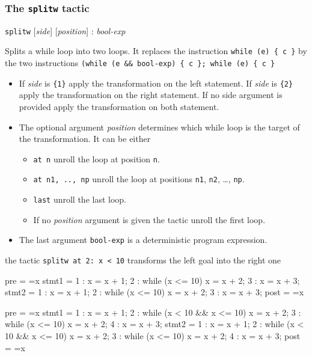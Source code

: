 \subsubsection{The \texttt{splitw} tactic}\label{tac:splitw} \DONE

\Syntax \verb+splitw+ [\textit{side}] [\textit{position}] : \textit{bool-exp}

\Description Splits a while loop into two loops. It replaces
the instruction \verb+while (e) { c }+ by the two instructions
\verb+(while (e && bool-exp) { c }; while (e) { c }+
\begin{itemize}
 \item If \textit{side} is \verb+{1}+ apply the transformation on the left
   statement.  If \textit{side} is \verb+{2}+ apply the transformation on the
   right statement. If no side argument is provided apply the transformation
   on both statement.
 \item The optional argument \textit{position} determines which while loop is
  the target of the transformation. It can be either
  \begin{itemize}
     \item \verb+at n+ unroll the loop at position \verb+n+. 
     \item \verb+at n1, .., np+ unroll the loop at positions \verb+n1+, 
           \verb+n2+, \ldots, \verb+np+. 
     \item \verb+last+ unroll the last loop.
     \item If no \textit{position} argument is given the tactic unroll 
           the first loop.
  \end{itemize} 
 \item The last argument \verb+bool-exp+ is a deterministic program expression.
\end{itemize} 

\Example the tactic \verb+splitw at 2: x < 10+ transforms the left goal into
the right one

\begin{minicode}{0.4}

pre   = ={x}
stmt1 =   1 : x = x + 1;
          2 : while (x <= 10) 
                x = x + 2;
          3 : x = x + 3;
stmt2 =   1 : x = x + 1;
          2 : while (x <= 10) 
                x = x + 2;
          3 : x = x + 3;
post  = ={x}

\end{minicode}
\begin{minicode}{0.6}

pre   = ={x}
stmt1 =   1 : x = x + 1;
          2 : while (x < 10 && x <= 10) 
                x = x + 2;
          3 : while (x <= 10) 
                x = x + 2;
          4 : x = x + 3;
stmt2 =   1 : x = x + 1;
          2 : while (x < 10 && x <= 10) 
                x = x + 2;
          3 : while (x <= 10) 
                x = x + 2;
          4 : x = x + 3;
post  = ={x}

\end{minicode}

